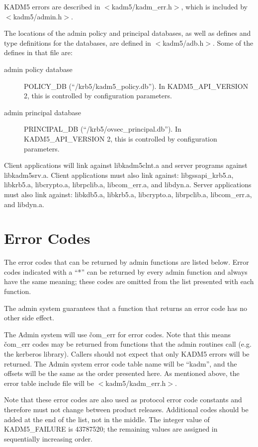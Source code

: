 KADM5 errors are described in $<$kadm5/kadm_err.h$>$, which
is included by $<$kadm5/admin.h$>$.

The locations of the admin policy and principal databases, as well as
defines and type definitions for the databases, are defined in
$<$kadm5/adb.h$>$.  Some of the defines in that file are:
\begin{description}
\item[admin policy database] POLICY_DB (``/krb5/kadm5_policy.db'').    In
KADM5_API_VERSION 2, this is controlled by configuration parameters.
\item[admin principal database] PRINCIPAL_DB
(``/krb5/ovsec_principal.db'').  In KADM5_API_VERSION 2, this is
controlled by configuration parameters.
\end{description}

Client applications will link against libkadm5clnt.a and server
programs against libkadm5srv.a.  Client applications must also link
against: libgssapi_krb5.a, libkrb5.a, libcrypto.a, librpclib.a,
libcom_err.a, and libdyn.a.  Server applications must also link
against: libkdb5.a, libkrb5.a, libcrypto.a, librpclib.a, libcom_err.a,
and libdyn.a.

\section{Error Codes}

The error codes that can be returned by admin functions are listed
below.  Error codes indicated with a ``*'' can be returned by every
admin function and always have the same meaning; these codes are
omitted from the list presented with each function.  

The admin system guarantees that a function that returns an error code
has no other side effect.

The Admin system will use \v{com_err} for error codes.  Note that this
means \v{com_err} codes may be returned from functions that the admin
routines call (e.g. the kerberos library). Callers should not expect
that only KADM5 errors will be returned.  The Admin system error code
table name will be ``kadm'', and the offsets will be the same as the
order presented here. As mentioned above, the error table include file
will be $<$kadm5/kadm_err.h$>$.

Note that these error codes are also used as protocol error code
constants and therefore must not change between product releases.
Additional codes should be added at the end of the list, not in the
middle.  The integer value of KADM5_FAILURE is 43787520; the
remaining values are assigned in sequentially increasing order.

